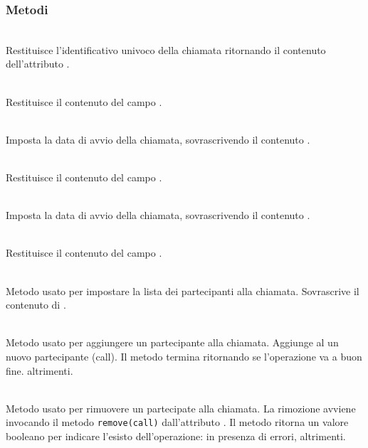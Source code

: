 \subsubsection*{Metodi}
\begin{description}
	\item{}\\
	Restituisce l'identificativo univoco della chiamata ritornando il contenuto dell'attributo .
	\item{}\\
	Restituisce il contenuto del campo .
	\item{}\\
	Imposta la data di avvio della chiamata, sovrascrivendo il contenuto .
	\item{}\\
	Restituisce il contenuto del campo .
	\item{}\\
	Imposta la data di avvio della chiamata, sovrascrivendo il contenuto .
	\item{}\\
	Restituisce il contenuto del campo .
	\item{}\\
	Metodo usato per impostare la lista dei partecipanti alla chiamata. Sovrascrive il contenuto di .
	\item{}\\
	Metodo usato per aggiungere un partecipante alla chiamata. Aggiunge al  un nuovo partecipante (call). Il metodo termina ritornando  se l'operazione va a buon fine.  altrimenti.
	\item{}\\
	Metodo usato per rimuovere un partecipate alla chiamata. La rimozione avviene invocando il metodo \texttt{remove(call)} dall'attributo . Il metodo ritorna un valore booleano per indicare l'esisto dell'operazione:  in presenza di errori,  altrimenti.
\end{description}

